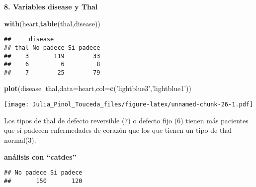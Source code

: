 \documentclass[]{article}
\newenvironment{Shaded}{\begin{snugshade}}{\end{snugshade}}
\newcommand{\KeywordTok}[1]{\textcolor[rgb]{0.13,0.29,0.53}{\textbf{#1}}}
\newcommand{\DataTypeTok}[1]{\textcolor[rgb]{0.13,0.29,0.53}{#1}}
\newcommand{\DecValTok}[1]{\textcolor[rgb]{0.00,0.00,0.81}{#1}}
\newcommand{\StringTok}[1]{\textcolor[rgb]{0.31,0.60,0.02}{#1}}
\newcommand{\CommentTok}[1]{\textcolor[rgb]{0.56,0.35,0.01}{\textit{#1}}}
\newcommand{\OperatorTok}[1]{\textcolor[rgb]{0.81,0.36,0.00}{\textbf{#1}}}
\newcommand{\NormalTok}[1]{#1}
\begin{document}
\textbf{8. Variables disease y Thal}

\begin{Shaded}
\begin{Highlighting}[]
\KeywordTok{with}\NormalTok{(heart,}\KeywordTok{table}\NormalTok{(thal,disease)) }
\end{Highlighting}
\end{Shaded}

\begin{verbatim}
##     disease
## thal No padece Si padece
##    3       119        33
##    6         6         8
##    7        25        79
\end{verbatim}

\begin{Shaded}
\begin{Highlighting}[]
\KeywordTok{plot}\NormalTok{(disease}\OperatorTok{~}\NormalTok{thal,}\DataTypeTok{data=}\NormalTok{heart,}\DataTypeTok{col=}\KeywordTok{c}\NormalTok{(}\StringTok{'lightblue3'}\NormalTok{,}\StringTok{'lightblue1'}\NormalTok{))}
\end{Highlighting}
\end{Shaded}

\texttt{[image: Julia\_Pinol\_Touceda\_files/figure-latex/unnamed-chunk-26-1.pdf]}

Los tipos de thal de defecto reversible (7) o defecto fijo (6) tienen
más pacientes que sí padecen enfermedades de corazón que los que tienen
un tipo de thal normal(3).

\textbf{análisis con ``catdes''}

\begin{Shaded}
\end{Shaded}

\begin{verbatim}
## No padece Si padece 
##       150       120
\end{verbatim}

\begin{Shaded}
\end{Shaded}
\end{document}
